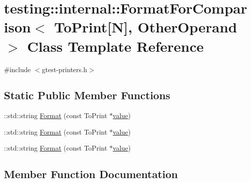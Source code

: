 \hypertarget{classtesting_1_1internal_1_1_format_for_comparison_3_01_to_print[_n]_00_01_other_operand_01_4}{}\section{testing\+::internal\+::Format\+For\+Comparison$<$ To\+Print\mbox{[}N\mbox{]}, Other\+Operand $>$ Class Template Reference}
\label{classtesting_1_1internal_1_1_format_for_comparison_3_01_to_print[_n]_00_01_other_operand_01_4}


{\ttfamily \#include $<$gtest-\/printers.\+h$>$}

\subsection*{Static Public Member Functions}
\begin{DoxyCompactItemize}
\item 
\+::std\+::string \mbox{\hyperlink{classtesting_1_1internal_1_1_format_for_comparison_3_01_to_print[_n]_00_01_other_operand_01_4_a76c526461c8fa7df75f7b32ab889b9e0}{Format}} (const To\+Print $\ast$\mbox{\hyperlink{_obj__test_2lib_2googletest-master_2googlemock_2test_2gmock-matchers__test_8cc_a337b8a670efc0b086ad3af163f3121b6}{value}})
\item 
\+::std\+::string \mbox{\hyperlink{classtesting_1_1internal_1_1_format_for_comparison_3_01_to_print[_n]_00_01_other_operand_01_4_a76c526461c8fa7df75f7b32ab889b9e0}{Format}} (const To\+Print $\ast$\mbox{\hyperlink{_obj__test_2lib_2googletest-master_2googlemock_2test_2gmock-matchers__test_8cc_a337b8a670efc0b086ad3af163f3121b6}{value}})
\item 
\+::std\+::string \mbox{\hyperlink{classtesting_1_1internal_1_1_format_for_comparison_3_01_to_print[_n]_00_01_other_operand_01_4_a76c526461c8fa7df75f7b32ab889b9e0}{Format}} (const To\+Print $\ast$\mbox{\hyperlink{_obj__test_2lib_2googletest-master_2googlemock_2test_2gmock-matchers__test_8cc_a337b8a670efc0b086ad3af163f3121b6}{value}})
\end{DoxyCompactItemize}


\subsection{Member Function Documentation}
\mbox{\label{classtesting_1_1internal_1_1_format_for_comparison_3_01_to_print[_n]_00_01_other_operand_01_4_a76c526461c8fa7df75f7b32ab889b9e0}} 
